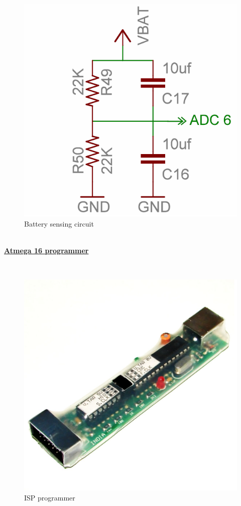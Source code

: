 \documentclass[a4paper,12pt,oneside]{book}
\begin{document}
	\hfill\\
	\begin{figure}[h!]
		\caption{Battery sensing circuit}
		\includegraphics[width=\textwidth]{./HardwareManual/battery_voltage_sensor.png}
	\end{figure}	
	\hfill\\
	
	\underline{\textbf{\Large{Atmega 16 programmer}}}
	
	\hfill\\
	\begin{figure}[h!]
		\caption{ISP programmer}
		\includegraphics[width=\textwidth]{./HardwareManual/ISP_programmer.png}
	\end{figure}	
	\hfill\\
	
\end{document}
